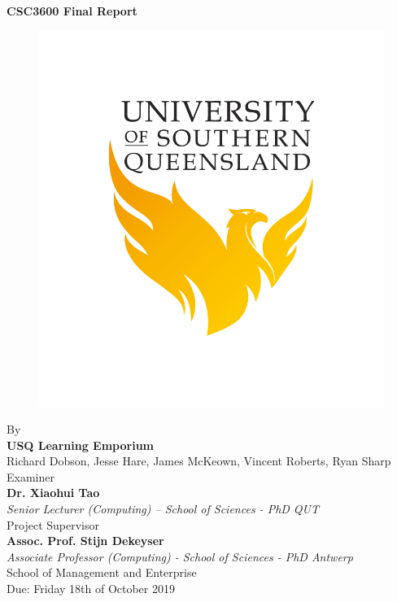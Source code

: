 \documentclass[11pt]{article}
\begin{document}

    \begin{titlepage}
        \centering
        \vspace {1cm}
        \huge{\textbf{CSC3600 Final Report}} \\ [0.1cm]
        \begin{figure}[ht!]
            \centering
            \def\svgwidth{0.5\columnwidth}
            \includegraphics[scale={0.20}]{USQ.jpg}
        \end{figure}
        \vspace {0.5cm}
        \Large{By} \\
        \Large{\textbf{USQ Learning Emporium}} \\
        \Large{Richard Dobson, Jesse Hare, James McKeown, Vincent Roberts, Ryan Sharp} \\[0.50cm]
        \Large{Examiner} \\
        \Large{\textbf{Dr. Xiaohui Tao}} \\
        \Large{\textit{Senior Lecturer (Computing) – School of Sciences -
PhD QUT}} \\[0.50cm]
        \Large{Project Supervisor} \\
        \Large{\textbf{Assoc. Prof. Stijn Dekeyser}} \\
        \Large{\textit{Associate Professor (Computing) - School of Sciences - PhD Antwerp}} \\[0.50cm]
        \Large{School of Management and Enterprise} \\[0.50cm]

        \Large{Due: Friday 18th of October 2019}
    \end{titlepage}
\end{document}
